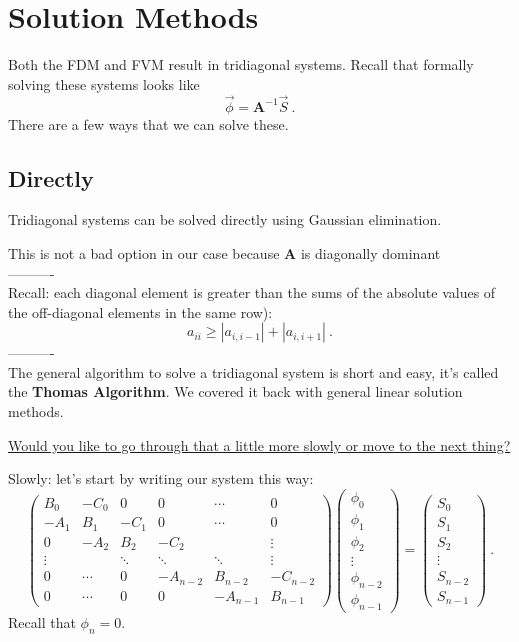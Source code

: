 \documentclass[12pt]{article}
\newcommand{\ve}[1]{\ensuremath{\mathbf{#1}}}
\begin{document}
\section*{Solution Methods}

Both the FDM and FVM result in tridiagonal systems. Recall that formally solving these systems looks like
\[\vec{\phi} = \ve{A}^{-1}\vec{S} \:.\]
There are a few ways that we can solve these. 

\subsection*{Directly}

Tridiagonal systems can be solved directly using Gaussian elimination. 

This is not a bad option in our case because $\ve{A}$ is diagonally dominant\\
----------\\
Recall:  
each diagonal element is greater than the sums of the absolute values of the off-diagonal elements in the same row):
\[a_{ii} \geq |a_{i,i-1}| + |a_{i, i+1}|\:.\] 
----------\\
%
The general algorithm to solve a tridiagonal system is short and easy, it's called the \textbf{Thomas Algorithm}. We covered it back with general linear solution methods. 

\underline{Would you like to go through that a little more slowly or move to the next thing?}

Slowly: let's start by writing our system this way:
%
\begin{equation}
\begin{pmatrix}
B_0  & -C_0 & 0    & 0    & \cdots & 0 \\
-A_1 & B_1  & -C_1 & 0    & \cdots & 0 \\
0    & -A_2 & B_2  & -C_2 & & \vdots \\
\vdots        &    & \ddots  & \ddots & \ddots & \vdots \\
0 & \cdots & 0 & -A_{n-2} & B_{n-2} & -C_{n-2} \\
0        & \cdots   & 0   & 0 & -A_{n-1} & B_{n-1} 
\end{pmatrix}
%
\begin{pmatrix}\phi_0 \\ \phi_1 \\ \phi_2 \\ \vdots \\ \phi_{n-2} \\ \phi_{n-1} \end{pmatrix} =
%
\begin{pmatrix}S_0 \\ S_1 \\ S_2 \\ \vdots \\ S_{n-2} \\ S_{n-1} \end{pmatrix} \:. \nonumber
\end{equation}
%
Recall that $\phi_n = 0$. 
\end{document}
